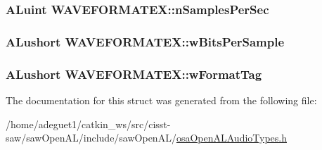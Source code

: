 \hypertarget{struct_w_a_v_e_f_o_r_m_a_t_e_x_a32952b7d978d3cb6032ddbcddde933ce}{
\subsubsection[{n\-Samples\-Per\-Sec}]{\setlength{\rightskip}{0pt plus 5cm}A\-Luint W\-A\-V\-E\-F\-O\-R\-M\-A\-T\-E\-X\-::n\-Samples\-Per\-Sec}}\label{struct_w_a_v_e_f_o_r_m_a_t_e_x_a32952b7d978d3cb6032ddbcddde933ce}
\hypertarget{struct_w_a_v_e_f_o_r_m_a_t_e_x_a7131210349a03e87c94d2f08a1530002}{
\subsubsection[{w\-Bits\-Per\-Sample}]{\setlength{\rightskip}{0pt plus 5cm}A\-Lushort W\-A\-V\-E\-F\-O\-R\-M\-A\-T\-E\-X\-::w\-Bits\-Per\-Sample}}\label{struct_w_a_v_e_f_o_r_m_a_t_e_x_a7131210349a03e87c94d2f08a1530002}
\hypertarget{struct_w_a_v_e_f_o_r_m_a_t_e_x_ae64cc7e3612e90153b9c85278e819661}{
\subsubsection[{w\-Format\-Tag}]{\setlength{\rightskip}{0pt plus 5cm}A\-Lushort W\-A\-V\-E\-F\-O\-R\-M\-A\-T\-E\-X\-::w\-Format\-Tag}}\label{struct_w_a_v_e_f_o_r_m_a_t_e_x_ae64cc7e3612e90153b9c85278e819661}


The documentation for this struct was generated from the following file\-:\begin{DoxyCompactItemize}
\item 
/home/adeguet1/catkin\-\_\-ws/src/cisst-\/saw/saw\-Open\-A\-L/include/saw\-Open\-A\-L/\hyperlink{osa_open_a_l_audio_types_8h}{osa\-Open\-A\-L\-Audio\-Types.\-h}\end{DoxyCompactItemize}
